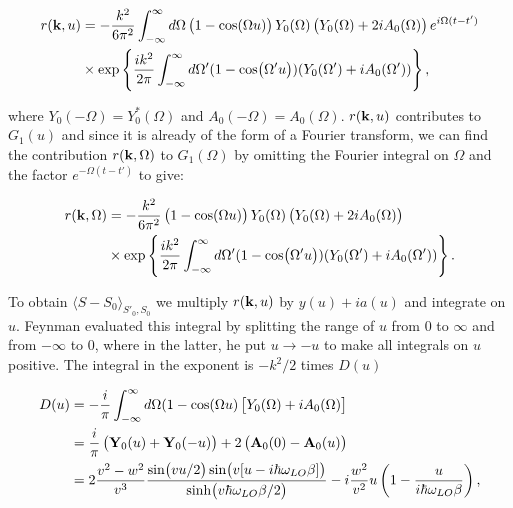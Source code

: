 \begin{equation}
    \begin{aligned}
        r(\vb{k}, u) &=  -\frac{k^2}{6\pi^2} \int^{\infty}_{-\infty} d\Omega \left(1 - \cos(\Omega u) \right) Y_0(\Omega) \left( Y_0(\Omega) + 2i A_0(\Omega) \right) e^{i\Omega (t - t')} \\
        &\times \exp\left\{ \frac{ik^2}{2\pi} \int^\infty_{-\infty} d\Omega' (1 - \cos(\Omega' u)) (Y_0(\Omega') + i A_0(\Omega')) \right\},
    \end{aligned}
\end{equation}

where $Y_0(-\Omega) = Y^*_0(\Omega)$ and $A_0(-\Omega) = A_0(\Omega)$. $r(\vb{k}, u)$ contributes to $G_1(u)$ and since it is already of the form of a Fourier transform, we can find the contribution $r(\vb{k}, \Omega)$ to $G_1(\Omega)$ by omitting the Fourier integral on $\Omega$ and the factor $e^{-\Omega(t - t')}$ to give:

\begin{equation}
    \begin{aligned}
        r(\vb{k}, \Omega) &= -\frac{k^2}{6\pi^2} \left(1 - \cos(\Omega u) \right) Y_0(\Omega) \left( Y_0(\Omega) + 2i A_0(\Omega) \right) \\
        &\times \exp\left\{ \frac{ik^2}{2\pi} \int^\infty_{-\infty} d\Omega' (1 - \cos(\Omega' u)) (Y_0(\Omega') + i A_0(\Omega')) \right\}.
    \end{aligned}
\end{equation}

To obtain $\langle S - S_0 \rangle_{S'_0, S_0}$ we multiply $r(\vb{k}, u)$ by $y(u) + ia(u)$ and integrate on $u$. Feynman evaluated this integral by splitting the range of $u$ from $0$ to $\infty$ and from $-\infty$ to $0$, where in the latter, he put $u \to -u$ to make all integrals on $u$ positive. The integral in the exponent is $-k^2 / 2$ times $D(u)$

\begin{equation}\label{eqn:D_FHIP}
    \begin{aligned}
        D(u) &= -\frac{i}{\pi} \int^\infty_{-\infty} d\Omega (1 - \cos(\Omega u) \left[ Y_0(\Omega) + iA_0(\Omega) \right] \\
        &= \frac{i}{\pi} \left( \vb{Y}_0(u) + \vb{Y}_0(-u) \right) + 2 \left( \vb{A}_0(0) - \vb{A}_0(u) \right) \\
        &= 2 \frac{v^2-w^2}{v^3} \frac{\sin(vu/2) \sin(v[u-i\hbar\omega_{LO}\beta])}{\sinh(v\hbar\omega_{LO}\beta/2)}-i\frac{w^2}{v^2}u\left(1-\frac{u}{i\hbar\omega_{LO}\beta}\right),
    \end{aligned}
\end{equation}

